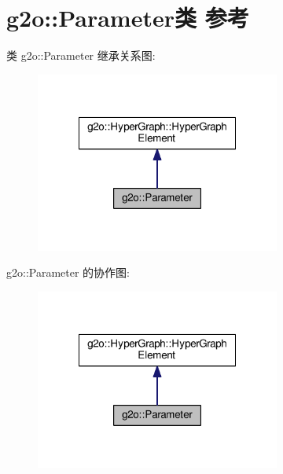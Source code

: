 \hypertarget{classg2o_1_1Parameter}{\section{g2o\-:\-:Parameter类 参考}
\label{classg2o_1_1Parameter}
}


类 g2o\-:\-:Parameter 继承关系图\-:
\nopagebreak
\begin{figure}[H]
\begin{center}
\leavevmode
\includegraphics[width=228pt]{classg2o_1_1Parameter__inherit__graph}
\end{center}
\end{figure}


g2o\-:\-:Parameter 的协作图\-:
\nopagebreak
\begin{figure}[H]
\begin{center}
\leavevmode
\includegraphics[width=228pt]{classg2o_1_1Parameter__coll__graph}
\end{center}
\end{figure}
